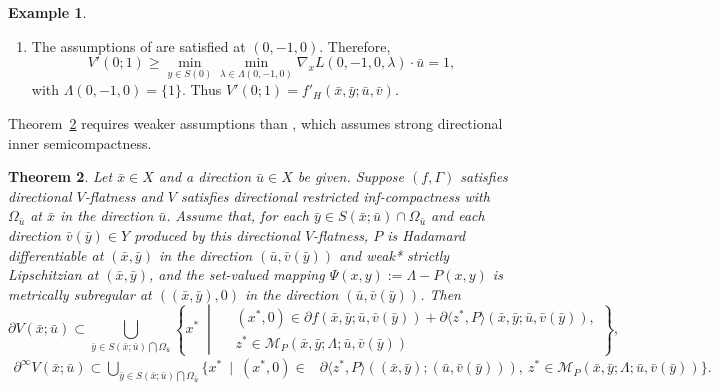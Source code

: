 \documentclass[12pt,twoside,reqno]{amsart}
\newtheorem{theorem}{Theorem}[section]
\theoremstyle{definition}
\newtheorem{example}[theorem]{Example}
\numberwithin{equation}{section}
\begin{document}
\begin{example}
\begin{enumerate}
    \item[\rm (iii)] The assumptions of \cite[Corollary~4.3]{gauvin1982differential} are satisfied at $(0,-1,0)$. Therefore,
    \begin{equation*}
            V'(0; 1) \geq \min_{y \in S(0)} \min_{\lambda \in \Lambda(0, -1,0)} \nabla_x L(0, -1, 0, \lambda) \cdot \bar{u}=1, 
        \end{equation*}
        with $\Lambda(0, -1,0) = \{1\}$. Thus $V'(0; 1)= f'_H(\bar x,\bar y;\bar u,\bar v)$. 
\end{enumerate}
\end{example}

Theorem~\ref{thm: directional subdifferential of V} requires weaker assumptions than \cite[Theorem~5.10]{long2017calculus}, which assumes strong directional inner semicompactness.   

\begin{theorem}\label{thm: directional subdifferential of V}
Let $\bar{x} \in X$ and a direction $\bar u \in X$ be given. Suppose $(f, \Gamma)$ satisfies directional $V$-flatness and $V$ satisfies directional restricted inf-compactness with $\Omega_{\bar u}$ at $\bar{x}$ in the direction $\bar u$. Assume that, for each $\bar{y} \in S(\bar{x};\bar u) \cap \Omega_{\bar u}$ and each direction $\bar v(\bar{y}) \in Y$ produced by this directional $V$-flatness, $P$ is Hadamard differentiable at $(\bar{x}, \bar{y})$ in the direction $(\bar u, \bar v(\bar{y}))$ and weak* strictly Lipschitzian at $(\bar{x}, \bar y)$, and the set-valued mapping $\Psi(x, y) := \Lambda - P(x, y)$ is metrically subregular at $((\bar{x}, \bar{y}), 0)$ in the direction $(\bar u, \bar v(\bar{y}))$. Then 
\begin{equation*}
    \partial V(\bar{x}; \bar u) \subset  \bigcup\limits_{\bar y\in S(\bar x; \bar u)\bigcap \Omega_{\bar u}} \left\{ x^* \;\middle|\;
    \begin{aligned}
        &(x^*, 0) \in \partial f(\bar{x}, \bar{y}; \bar u, \bar v(\bar{y})) + \partial \langle z^*, P \rangle(\bar{x}, \bar{y}; \bar u, \bar v(\bar{y})), \\
        &z^* \in \mathcal{M}_P(\bar{x}, \bar{y}; \Lambda; \bar{u}, \bar{v}(\bar y))
    \end{aligned}
    \right\}, 
\end{equation*}
\begin{equation*}
\begin{split}
    \partial^\infty V(\bar{x}; \bar u) \subset \bigcup\limits_{\bar y\in S(\bar x;\bar u)\bigcap \Omega_{\bar u}}\{ x^* ~\mid ~ 
 (x^*, 0) \in &\partial \langle z^*, P \rangle((\bar{x}, \bar{y}); (\bar u, \bar v(\bar{y}))),~ z^* \in \mathcal{M}_P(\bar{x}, \bar{y};\Lambda; \bar u, \bar{v}(\bar y))
    \}.
\end{split}
\end{equation*}
\end{theorem}
\end{document}
